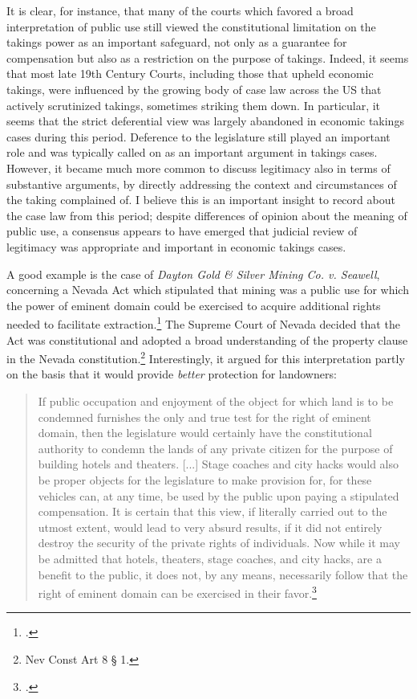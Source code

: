 It is clear, for instance, that many of the courts which favored a broad interpretation of public use still viewed the constitutional limitation on the takings power as an important safeguard, not only as a guarantee for compensation but also as a restriction on the purpose of takings. Indeed, it seems that most late 19th Century Courts, including those that upheld economic takings, were influenced by the growing body of case law across the US that actively scrutinized takings, sometimes striking them down. In particular, it seems that the strict deferential view was largely abandoned in economic takings cases during this period. Deference to the legislature still played an important role and was typically called on as an important argument in takings cases. However, it became much more common to discuss legitimacy also in terms of substantive arguments, by directly addressing the context and circumstances of the taking complained of. I believe this is an important insight to record about the case law from this period; despite differences of opinion about the meaning of public use, a consensus appears to have emerged that judicial review of legitimacy was appropriate and important in economic takings cases.

A good example is the case of {\it Dayton Gold \& Silver Mining Co. v. Seawell}, concerning a Nevada Act which stipulated that mining was a public use for which the power of eminent domain could be exercised to acquire additional rights needed to facilitate extraction.\footcite{seawell76} The Supreme Court of Nevada decided that the Act was constitutional and adopted a broad understanding of the property clause in the Nevada constitution.\footnote{Nev Const Art 8 § 1.} Interestingly, it argued for this interpretation partly on the basis that it would provide {\it better} protection for landowners:

\begin{quote}
If public occupation and enjoyment of the object for which land is to be condemned furnishes the only and true test for the right of eminent domain, then the legislature would certainly have the constitutional authority to condemn the lands of any private citizen for the purpose of building hotels and theaters. [...] Stage coaches and city hacks would also be proper objects for the legislature to make provision for, for these vehicles can, at any time, be used by the public upon paying a stipulated compensation. It is certain that this view, if literally carried out to the utmost extent, would lead to very absurd results, if it did not entirely destroy the security of the private rights of individuals. Now while it may be admitted that hotels, theaters, stage coaches, and city hacks, are a benefit to the public, it does not, by any means, necessarily follow that the right of eminent domain can be exercised in their favor.\footcite[410-411]{seawell76}
\end{quote}

